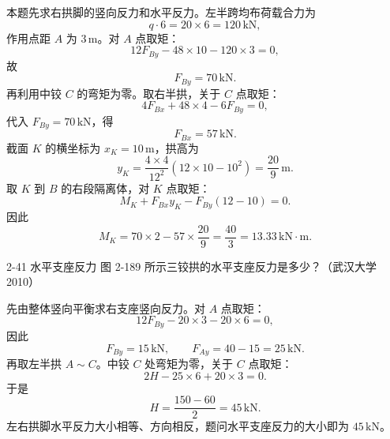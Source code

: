 \begin{solutioncard}

本题先求右拱脚的竖向反力和水平反力。左半跨均布荷载合力为
\[
  q\cdot6=20\times6=120\,\mathrm{kN},
\]
作用点距 \(A\) 为 \(3\,\mathrm{m}\)。对 \(A\) 点取矩：
\[
  12F_{By}-48\times10-120\times3=0,
\]
故
\[
  F_{By}=70\,\mathrm{kN}.
\]
再利用中铰 \(C\) 的弯矩为零。取右半拱，关于 \(C\) 点取矩：
\[
  4F_{Bx}+48\times4-6F_{By}=0,
\]
代入 \(F_{By}=70\,\mathrm{kN}\)，得
\[
  F_{Bx}=57\,\mathrm{kN}.
\]
截面 \(K\) 的横坐标为 \(x_K=10\,\mathrm{m}\)，拱高为
\[
  y_K=\frac{4\times4}{12^2}(12\times10-10^2)
      =\frac{20}{9}\,\mathrm{m}.
\]
取 \(K\) 到 \(B\) 的右段隔离体，对 \(K\) 点取矩：
\[
  M_K+F_{Bx}y_K-F_{By}(12-10)=0.
\]
因此
\[
  M_K=70\times2-57\times\frac{20}{9}
      =\frac{40}{3}
      =13.33\,\mathrm{kN\cdot m}.
\]
\end{solutioncard}

\begin{problemcard}{2-41 水平支座反力}
图 2-189 所示三铰拱的水平支座反力是多少？（武汉大学 2010）
\begin{figure}[H]
\centering
{}
\end{figure}
\end{problemcard}

\begin{solutioncard}

先由整体竖向平衡求右支座竖向反力。对 \(A\) 点取矩：
\[
  12F_{By}-20\times3-20\times6=0,
\]
因此
\[
  F_{By}=15\,\mathrm{kN},\qquad F_{Ay}=40-15=25\,\mathrm{kN}.
\]
再取左半拱 \(A\sim C\)。中铰 \(C\) 处弯矩为零，关于 \(C\) 点取矩：
\[
  2H-25\times6+20\times3=0.
\]
于是
\[
  H=\frac{150-60}{2}=45\,\mathrm{kN}.
\]
左右拱脚水平反力大小相等、方向相反，题问水平支座反力的大小即为 \(45\,\mathrm{kN}\)。
\end{solutioncard}

